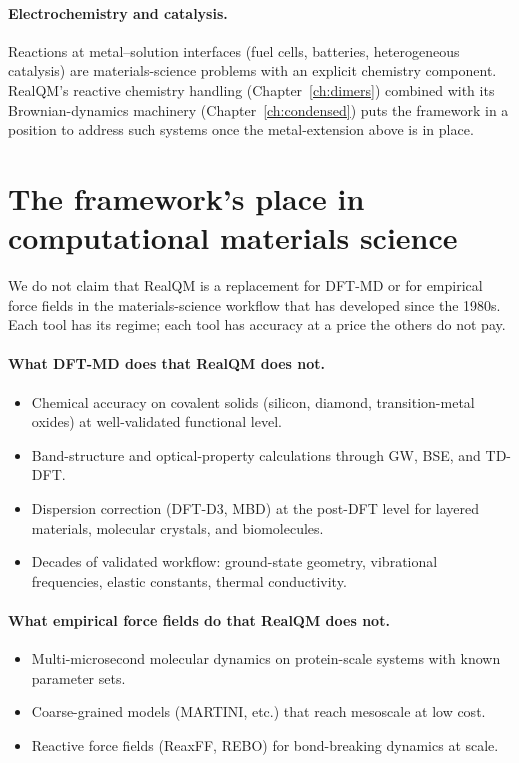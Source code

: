 \paragraph{Electrochemistry and catalysis.}
Reactions at metal--solution interfaces (fuel cells, batteries, heterogeneous catalysis) are materials-science problems with an explicit chemistry component. RealQM's reactive chemistry handling (Chapter~\ref{ch:dimers}) combined with its Brownian-dynamics machinery (Chapter~\ref{ch:condensed}) puts the framework in a position to address such systems once the metal-extension above is in place.

\section{The framework's place in computational materials science}\label{sec:material-place}

We do not claim that RealQM is a replacement for DFT-MD or for empirical force fields in the materials-science workflow that has developed since the 1980s. Each tool has its regime; each tool has accuracy at a price the others do not pay.

\paragraph{What DFT-MD does that RealQM does not.}
\begin{itemize}
\item Chemical accuracy on covalent solids (silicon, diamond, transition-metal oxides) at well-validated functional level.
\item Band-structure and optical-property calculations through GW, BSE, and TD-DFT.
\item Dispersion correction (DFT-D3, MBD) at the post-DFT level for layered materials, molecular crystals, and biomolecules.
\item Decades of validated workflow: ground-state geometry, vibrational frequencies, elastic constants, thermal conductivity.
\end{itemize}

\paragraph{What empirical force fields do that RealQM does not.}
\begin{itemize}
\item Multi-microsecond molecular dynamics on protein-scale systems with known parameter sets.
\item Coarse-grained models (MARTINI, etc.) that reach mesoscale at low cost.
\item Reactive force fields (ReaxFF, REBO) for bond-breaking dynamics at scale.
\end{itemize}

